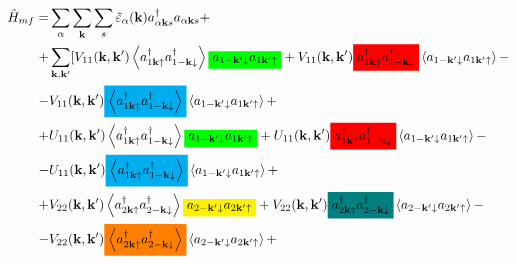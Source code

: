 \documentclass[class=article, crop=false]{standalone}
\newcommand{\mathcolorbox}[2]{\colorbox{#1}{$\displaystyle #2$}}
\begin{document}
\begin{equation} \label{key}
	\begin{split}
		\hat{H}_{mf} = & \sum_{ \alpha} \sum_{ \mathbf{k}} \sum_{s} \tilde{ \varepsilon}_{ \alpha} ( \mathbf{k}) a^{ \dagger}_{ \alpha \mathbf{k} s} a_{ \alpha \mathbf{k} s} + \\
		+ & \sum_{ \mathbf{k}, \mathbf{k}'} [ V_{ 1 1} ( \mathbf{k}, \mathbf{k}') \left\langle a^{ \dagger}_{ 1 \mathbf{k} \uparrow} a^{ \dagger}_{ 1 -\mathbf{k} \downarrow} \right\rangle \mathcolorbox{green}{a_{ 1 -\mathbf{k}' \downarrow} a_{ 1 \mathbf{k}' \uparrow}} + V_{ 1 1} ( \mathbf{k}, \mathbf{k}') \mathcolorbox{red}{a^{ \dagger}_{ 1 \mathbf{k} \uparrow} a^{ \dagger}_{ 1 -\mathbf{k} \downarrow}} \left\langle a_{ 1 -\mathbf{k}' \downarrow} a_{ 1 \mathbf{k}' \uparrow} \right\rangle - \\
		- & V_{ 1 1} ( \mathbf{k}, \mathbf{k}') \mathcolorbox{cyan}{\left\langle a^{ \dagger}_{ 1 \mathbf{k} \uparrow} a^{ \dagger}_{ 1 -\mathbf{k} \downarrow} \right\rangle} \left\langle a_{ 1 -\mathbf{k}' \downarrow} a_{ 1 \mathbf{k}' \uparrow} \right\rangle + \\
		+ & U_{ 1 1} ( \mathbf{k}, \mathbf{k}') \left\langle a^{ \dagger}_{ 1 \mathbf{k} \uparrow} a^{ \dagger}_{ 1 -\mathbf{k} \downarrow} \right\rangle \mathcolorbox{green}{a_{ 1 -\mathbf{k}' \downarrow} a_{ 1 \mathbf{k}' \uparrow}} + U_{ 1 1} ( \mathbf{k}, \mathbf{k}') \mathcolorbox{red}{a^{ \dagger}_{ 1 \mathbf{k} \uparrow} a^{ \dagger}_{ 1 -\mathbf{k} \downarrow}} \left\langle a_{ 1 -\mathbf{k}' \downarrow} a_{ 1 \mathbf{k}' \uparrow} \right\rangle - \\
		- & U_{ 1 1} ( \mathbf{k}, \mathbf{k}') \mathcolorbox{cyan}{\left\langle a^{ \dagger}_{ 1 \mathbf{k} \uparrow} a^{ \dagger}_{ 1 -\mathbf{k} \downarrow} \right\rangle} \left\langle a_{ 1 -\mathbf{k}' \downarrow} a_{ 1 \mathbf{k}' \uparrow} \right\rangle + \\
		+ & V_{ 2 2} ( \mathbf{k}, \mathbf{k}') \left\langle a^{ \dagger}_{ 2 \mathbf{k} \uparrow} a^{ \dagger}_{ 2 -\mathbf{k} \downarrow} \right\rangle \mathcolorbox{yellow}{a_{ 2 -\mathbf{k}' \downarrow} a_{ 2 \mathbf{k}' \uparrow}} + V_{ 2 2} ( \mathbf{k}, \mathbf{k}') \mathcolorbox{teal}{a^{ \dagger}_{ 2 \mathbf{k} \uparrow} a^{ \dagger}_{ 2 -\mathbf{k} \downarrow}} \left\langle a_{ 2 -\mathbf{k}' \downarrow} a_{ 2 \mathbf{k}' \uparrow} \right\rangle - \\
		- & V_{ 2 2} ( \mathbf{k}, \mathbf{k}') \mathcolorbox{orange}{\left\langle a^{ \dagger}_{ 2 \mathbf{k} \uparrow} a^{ \dagger}_{ 2 -\mathbf{k} \downarrow} \right\rangle} \left\langle a_{ 2 -\mathbf{k}' \downarrow} a_{ 2 \mathbf{k}' \uparrow} \right\rangle + \\

\end{split}
\end{equation}
\end{document}
